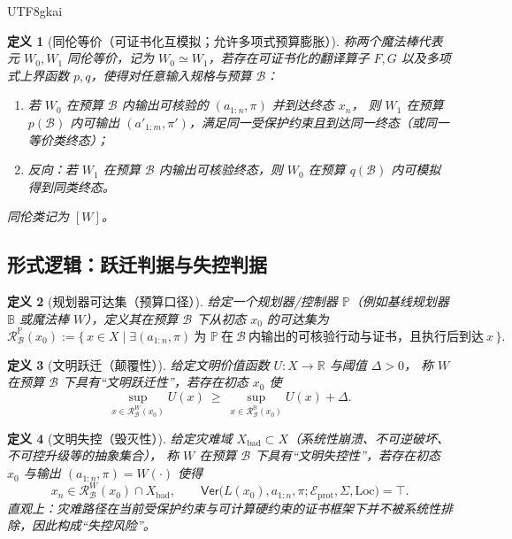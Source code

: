 \documentclass[12pt]{article}
\newtheorem{definition}{定义}[section]
\newcommand{\RR}{\mathbb{R}}
\begin{document}
\begin{CJK*}{UTF8}{gkai}
\begin{definition}[同伦等价（可证书化互模拟；允许多项式预算膨胀）]
\label{def:wand-homotopy-equivalence}
称两个魔法棒代表元 $W_0,W_1$ 同伦等价，记为 $W_0\simeq W_1$，若存在可证书化的翻译算子 $F,G$
以及多项式上界函数 $p,q$，使得对任意输入规格与预算 $\mathcal{B}$：
\begin{enumerate}
  \item 若 $W_0$ 在预算 $\mathcal{B}$ 内输出可核验的 $(a_{1:n},\pi)$ 并到达终态 $x_n$，
  则 $W_1$ 在预算 $p(\mathcal{B})$ 内可输出 $(a'_{1:m},\pi')$，满足同一受保护约束且到达同一终态（或同一等价类终态）；
  \item 反向：若 $W_1$ 在预算 $\mathcal{B}$ 内输出可核验终态，则 $W_0$ 在预算 $q(\mathcal{B})$ 内可模拟得到同类终态。
\end{enumerate}
同伦类记为 $[W]$。
\end{definition}

\subsection{形式逻辑：跃迁判据与失控判据}
\label{sec:magic-wand-leap-loss-criteria}

\begin{definition}[规划器可达集（预算口径）]
\label{def:planner-reachable-set}
给定一个规划器/控制器 $\mathbb{P}$（例如基线规划器 $\mathbb{B}$ 或魔法棒 $W$），定义其在预算 $\mathcal{B}$ 下从初态 $x_0$ 的可达集为
\[
  \mathcal{R}^{\mathbb{P}}_{\mathcal{B}}(x_0)
  :=
  \{\,x\in X\mid \exists (a_{1:n},\pi)\ \text{为 }\mathbb{P}\ \text{在}\ \mathcal{B}\ \text{内输出的可核验行动与证书，且执行后到达}\ x\,\}.
\]
\end{definition}

\begin{definition}[文明跃迁（颠覆性）]
\label{def:civilization-leap}
给定文明价值函数 $U:X\to\RR$ 与阈值 $\Delta>0$，
称 $W$ 在预算 $\mathcal{B}$ 下具有“文明跃迁性”，若存在初态 $x_0$ 使
\[
  \sup_{x\in \mathcal{R}^{W}_{\mathcal{B}}(x_0)}U(x)
  \ \ge\
  \sup_{x\in \mathcal{R}^{\mathbb{B}}_{\mathcal{B}}(x_0)}U(x)
  +\Delta.
\]
\end{definition}

\begin{definition}[文明失控（毁灭性）]
\label{def:civilization-loss}
给定灾难域 $X_{\mathrm{bad}}\subset X$（系统性崩溃、不可逆破坏、不可控升级等的抽象集合），
称 $W$ 在预算 $\mathcal{B}$ 下具有“文明失控性”，若存在初态 $x_0$ 与输出 $(a_{1:n},\pi)=W(\cdot)$ 使得
\[
  x_n\in \mathcal{R}^{W}_{\mathcal{B}}(x_0)\cap X_{\mathrm{bad}},
  \qquad
  \mathsf{Ver}\bigl(L(x_0),a_{1:n},\pi;\mathcal{E}_{\mathrm{prot}},\Sigma,\mathrm{Loc}\bigr)=\top.
\]
直观上：灾难路径在当前受保护约束与可计算硬约束的证书框架下并不被系统性排除，因此构成“失控风险”。
\end{definition}


\end{CJK*}
\end{document}
